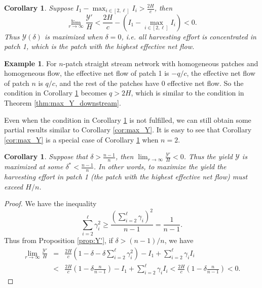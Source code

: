\documentclass[11pt]{article}
\newtheorem{corollary}[theorem]{Corollary}
\def\YY{\mathcal{Y}}
\theoremstyle{definition}
\newtheorem{example}[theorem]{Example}
\begin{document}
\begin{corollary}\label{cor:maxY}
    Suppose $I_1-\max_{i\in[2,\ell]} I_i > \frac{2H}{c}$, then
    \[
    \lim_{r\to\infty} \frac{\YY'}{H} < \frac{2H}{c} - (I_1-\max_{i\in[2,\ell]} I_i ) <0.
    \]
    Thus $\YY(\delta)$ is maximized when $\delta=0$, i.e. all harvesting effort is concentrated in patch 1, which is the patch with the highest effective net flow.
\end{corollary}


\begin{example}
    For $n$-patch straight stream network with homogeneous patches and homogeneous flow, the effective net flow of patch 1 is $-q/c$, the effective net flow of patch $n$ is $q/c$, and the rest of the patches have 0 effective net flow. So the condition in Corollary \ref{cor:maxY} becomes $q>2H$, which is similar to the condition in Theorem \ref{thm:max_Y_downstream}.
\end{example}

Even when the condition in Corollary \ref{cor:maxY} is not fulfilled, we can still obtain some partial results similar to Corollary \ref{cor:max_Y}. It is easy to see that  Corollary \ref{cor:max_Y} is a special case of Corollary \ref{cor:H/n} when $n=2$.



\begin{corollary}\label{cor:H/n}
Suppose that $\delta>\frac{n-1}{n}$, then  $\lim_{r\to\infty} \frac{\YY'}{H}<0$. Thus the yield $\YY$ is maximized at some $\delta^*<\frac{n-1}{n}$. In other words, to maximize the yield the harvesting effort in patch 1 (the patch with the highest effective net flow) must exceed $H/n$.   
\end{corollary}
\begin{proof}
    We have the inequality
    \[
    \sum_{i=2}^\ell \gamma_i^2 \geq \frac{(\sum_{i=2}^\ell\gamma_i)^2}{n-1} = \frac{1}{n-1}.
 \]
 Thus from Proposition \ref{prop:Y'}, if $\delta>(n-1)/n$, we have
 \begin{eqnarray*}
   \lim_{r\to\infty} \frac{\YY'}{H} &=& \frac{2H}{c}(1-\delta-\delta
 \sum_{i=2}^\ell\gamma_i^2) -I_1+\sum_{i=2}^\ell \gamma_iI_i \\
 &<& \frac{2H}{c}(1-\delta\frac{n}{n-1})-I_1+\sum_{i=2}^\ell \gamma_iI_i <\frac{2H}{c}(1-\delta\frac{n}{n-1})<0.   
 \end{eqnarray*}
\end{proof}
\end{document}
